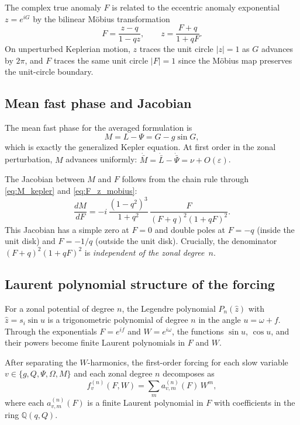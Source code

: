 \documentclass[11pt]{article}
\begin{document}
The complex true anomaly $F$ is related to the eccentric anomaly exponential
$z = e^{iG}$ by the bilinear M\"obius transformation
\begin{equation}
F = \frac{z - q}{1 - qz},
\qquad
z = \frac{F + q}{1 + qF}.
\label{eq:F_z_mobius}
\end{equation}
On unperturbed Keplerian motion, $z$ traces the unit circle $|z| = 1$ as $G$
advances by $2\pi$, and $F$ traces the same unit circle $|F| = 1$ since the
M\"obius map preserves the unit-circle boundary.

\subsection{Mean fast phase and Jacobian}

The mean fast phase for the averaged formulation is
\begin{equation}
M = L - \Psi = G - g\sin G,
\label{eq:M_kepler}
\end{equation}
which is exactly the generalized Kepler equation. At first order in the zonal
perturbation, $M$ advances uniformly:
$\dot{\bar M} = \dot{\bar L} - \dot{\bar\Psi} = \nu + O(\varepsilon)$.

The Jacobian between $M$ and $F$ follows from the chain rule through
\eqref{eq:M_kepler} and \eqref{eq:F_z_mobius}:
\begin{equation}
\frac{dM}{dF}
= -i\,\frac{(1-q^2)^3}{1+q^2}\,
\frac{F}{(F+q)^2(1+qF)^2}.
\label{eq:dMdF}
\end{equation}
This Jacobian has a simple zero at $F = 0$ and double poles at
$F = -q$ (inside the unit disk) and $F = -1/q$ (outside the unit disk).
Crucially, the denominator $(F+q)^2(1+qF)^2$ is \emph{independent of the
zonal degree~$n$}.

\subsection{Laurent polynomial structure of the forcing}

For a zonal potential of degree $n$, the Legendre polynomial
$P_n(\hat z)$ with $\hat z = s_i \sin u$ is a trigonometric polynomial
of degree $n$ in the angle $u = \omega + f$. Through the exponentials
$F = e^{if}$ and $W = e^{i\omega}$, the functions $\sin u$, $\cos u$, and
their powers become finite Laurent polynomials in $F$ and $W$.

After separating the $W$-harmonics, the first-order forcing for each slow
variable $v \in \{g, Q, \Psi, \Omega, M\}$ and each zonal degree $n$
decomposes as
\begin{equation}
f^{(n)}_v(F, W)
= \sum_{m} a^{(n)}_{v,m}(F)\, W^m,
\label{eq:forcing_W_decomp}
\end{equation}
where each $a^{(n)}_{v,m}(F)$ is a finite Laurent polynomial in $F$ with
coefficients in the ring $\mathbb{Q}(q, Q)$.
\end{document}
